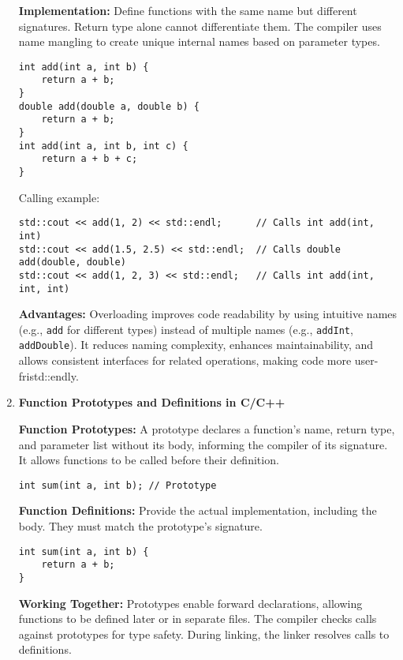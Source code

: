 \documentclass[a4paper,12pt]{article}
\begin{document}
\begin{enumerate}
\textbf{Implementation:} Define functions with the same name but different signatures. Return type alone cannot differentiate them. The compiler uses name mangling to create unique internal names based on parameter types.

\begin{lstlisting}
int add(int a, int b) {
    return a + b;
}
double add(double a, double b) {
    return a + b;
}
int add(int a, int b, int c) {
    return a + b + c;
}
\end{lstlisting}

Calling example:
\begin{lstlisting}
std::cout << add(1, 2) << std::endl;      // Calls int add(int, int)
std::cout << add(1.5, 2.5) << std::endl;  // Calls double add(double, double)
std::cout << add(1, 2, 3) << std::endl;   // Calls int add(int, int, int)
\end{lstlisting}

\textbf{Advantages:} Overloading improves code readability by using intuitive names (e.g., \texttt{add} for different types) instead of multiple names (e.g., \texttt{addInt}, \texttt{addDouble}). It reduces naming complexity, enhances maintainability, and allows consistent interfaces for related operations, making code more user-fristd::endly.

\item \textbf{Function Prototypes and Definitions in C/C++}

\textbf{Function Prototypes:} A prototype declares a function’s name, return type, and parameter list without its body, informing the compiler of its signature. It allows functions to be called before their definition.

\begin{lstlisting}
int sum(int a, int b); // Prototype
\end{lstlisting}

\textbf{Function Definitions:} Provide the actual implementation, including the body. They must match the prototype’s signature.

\begin{lstlisting}
int sum(int a, int b) {
    return a + b;
}
\end{lstlisting}

\textbf{Working Together:} Prototypes enable forward declarations, allowing functions to be defined later or in separate files. The compiler checks calls against prototypes for type safety. During linking, the linker resolves calls to definitions.


\end{enumerate}
\end{document}
